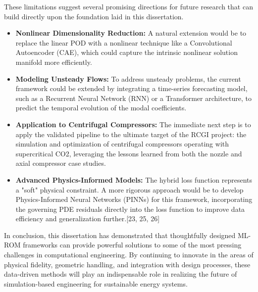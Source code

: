 \documentclass[12pt, a4paper]{report}
\begin{document}
These limitations suggest several promising directions for future research that can build directly upon the foundation laid in this dissertation.

\begin{itemize}
    \item \textbf{Nonlinear Dimensionality Reduction:} A natural extension would be to replace the linear POD with a nonlinear technique like a Convolutional Autoencoder (CAE), which could capture the intrinsic nonlinear solution manifold more efficiently.
    \item \textbf{Modeling Unsteady Flows:} To address unsteady problems, the current framework could be extended by integrating a time-series forecasting model, such as a Recurrent Neural Network (RNN) or a Transformer architecture, to predict the temporal evolution of the modal coefficients.
    \item \textbf{Application to Centrifugal Compressors:} The immediate next step is to apply the validated pipeline to the ultimate target of the RCGI project: the simulation and optimization of centrifugal compressors operating with supercritical CO2, leveraging the lessons learned from both the nozzle and axial compressor case studies.
    \item \textbf{Advanced Physics-Informed Models:} The hybrid loss function represents a "soft" physical constraint. A more rigorous approach would be to develop Physics-Informed Neural Networks (PINNs) for this framework, incorporating the governing PDE residuals directly into the loss function to improve data efficiency and generalization further.[23, 25, 26]
\end{itemize}

In conclusion, this dissertation has demonstrated that thoughtfully designed ML-ROM frameworks can provide powerful solutions to some of the most pressing challenges in computational engineering. By continuing to innovate in the areas of physical fidelity, geometric handling, and integration with design processes, these data-driven methods will play an indispensable role in realizing the future of simulation-based engineering for sustainable energy systems.
\end{document}
